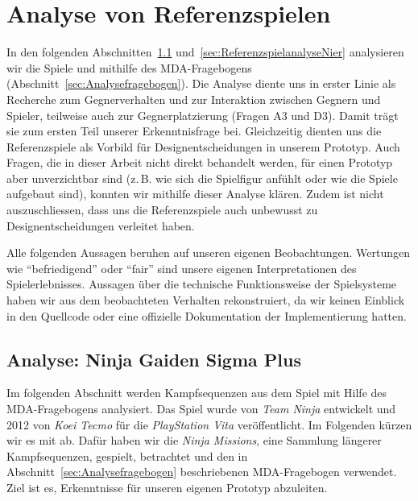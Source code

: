 \documentclass[../Main.tex]{subfiles}
\begin{document}
\section{Analyse von Referenzspielen} \label{sec:Referenzspielanalyse}

In den folgenden Abschnitten~\ref{sec:ReferenzspielanalyseNinja} und~\ref{sec:ReferenzspielanalyseNier} analysieren wir die Spiele  und  mithilfe des MDA-Fragebogens (Abschnitt~\ref{sec:Analysefragebogen}). Die Analyse diente uns in erster Linie als Recherche zum Gegnerverhalten und zur Interaktion zwischen Gegnern und Spieler, teilweise auch zur Gegnerplatzierung (Fragen A3 und D3). Damit trägt sie zum ersten Teil unserer Erkenntnisfrage bei. Gleichzeitig dienten uns die Referenzspiele als Vorbild für Designentscheidungen in unserem Prototyp. Auch Fragen, die in dieser Arbeit nicht direkt behandelt werden, für einen Prototyp aber unverzichtbar sind (z.\,B. wie sich die Spielfigur anfühlt oder wie die Spiele aufgebaut sind), konnten wir mithilfe dieser Analyse klären. Zudem ist nicht auszuschliessen, dass uns die Referenzspiele auch unbewusst zu Designentscheidungen verleitet haben.

Alle folgenden Aussagen beruhen auf unseren eigenen Beobachtungen. Wertungen wie \enquote{befriedigend} oder \enquote{fair} sind unsere eigenen Interpretationen des Spielerlebnisses. Aussagen über die technische Funktionsweise der Spielsysteme haben wir aus dem beobachteten Verhalten rekonstruiert, da wir keinen Einblick in den Quellcode oder eine offizielle Dokumentation der Implementierung hatten.

\subsection{Analyse: Ninja Gaiden Sigma Plus} \label{sec:ReferenzspielanalyseNinja}

Im folgenden Abschnitt werden Kampfsequenzen aus dem Spiel  mit Hilfe des MDA-Fragebogens analysiert. Das Spiel wurde von \textit{Team Ninja} entwickelt und 2012 von \textit{Koei Tecmo} für die \textit{PlayStation Vita} veröffentlicht.\autocite{koeitechmo_ninjagaiden_2012} Im Folgenden kürzen wir es mit  ab. Dafür haben wir die \textit{Ninja Missions}, eine Sammlung längerer Kampfsequenzen, gespielt, betrachtet und den in Abschnitt~\ref{sec:Analysefragebogen} beschriebenen MDA-Fragebogen verwendet. Ziel ist es, Erkenntnisse für unseren eigenen Prototyp abzuleiten.
\end{document}
